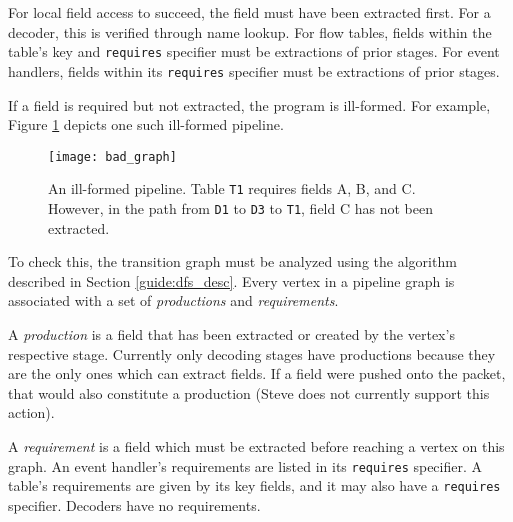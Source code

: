 


For local field access to succeed, the field must have been extracted first.
For a decoder, this is verified through name lookup. For flow tables, fields within the table's key and \texttt{requires} specifier must be extractions of prior stages. For event handlers, fields within its \texttt{requires} specifier must be extractions of prior stages. 

If a field is required but not extracted, the program is ill-formed.
For example, Figure \ref{fig:bad_graph} depicts one such ill-formed pipeline.

\begin{figure}[ht]
\texttt{[image: bad\_graph]}
\caption{An ill-formed pipeline. Table \texttt{T1} requires fields A, B, and C. However, in the path from \texttt{D1} to \texttt{D3} to \texttt{T1}, field C has not been extracted.}
\label{fig:bad_graph}
\end{figure}

To check this, the transition graph must be analyzed using the algorithm described in Section \ref{guide:dfs_desc}.
Every vertex in a pipeline graph is associated with a set of \textit{productions} and \textit{requirements}.

A \textit{production} is a field that has been extracted or created by the vertex's respective stage. Currently only decoding stages have productions because they are the only ones which can extract fields. If a field were pushed onto the packet, that would also constitute a production (Steve does not currently support this action).

A \emph{requirement} is a field which must be extracted before reaching a vertex on
this graph. An event handler's requirements are listed in its
\texttt{requires} specifier. A table's requirements are given by its
key fields, and it may also have a \texttt{requires} specifier. Decoders have no requirements.

